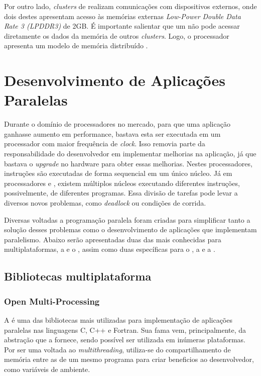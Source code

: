 Por outro lado, \textit{clusters} de \IO realizam comunicações com dispositivos externos, onde dois destes apresentam acesso às memórias externas \textit{Low-Power Double Data Rate 3 (LPDDR3)} de 2GB. É importante salientar que um \CC não pode acessar diretamente os dados da memória de outros \textit{clusters}. Logo, o processador apresenta um modelo de memória distribuído \cite{Castro-Souza-CCPE:2016, Podesta2018Stencil}.

\section{Desenvolvimento de Aplicações Paralelas}
\label{sec:bibliotecasdevparalelo}

Durante o domínio de processadores \singlecore no mercado, para que uma aplicação ganhasse aumento em performance, bastava esta ser executada em um processador com maior frequência de \textit{clock}. Isso removia parte da responsabilidade do desenvolvedor em implementar melhorias na aplicação, já que bastava o \textit{upgrade} no hardware para obter essas melhorias. Nestes processadores, instruções são executadas de forma sequencial em um único núcleo. Já em processadores \multicore e \manycore, existem múltiplos núcleos executando diferentes instruções, possivelmente, de diferentes programas. Essa divisão de tarefas pode levar a diversos novos problemas, como \textit{deadlock} ou condições de corrida.

Diversas \APIs voltadas a programação paralela foram criadas para simplificar tanto a solução desses problemas como o desenvolvimento de aplicações que implementam paralelismo. Abaixo serão apresentadas duas das mais conhecidas \APIs para multiplataformas, a \OpenMP e o \MPI, assim como duas \APIs específicas para o \mppa, a \ASYNC e a \IPC.

\subsection{Bibliotecas multiplataforma}
\label{sec:bibliotecasmultiplataforma}

\subsubsection{Open Multi-Processing}
\label{sec:openmp}

A \OpenMP é uma das bibliotecas mais utilizadas para implementação de aplicações paralelas nas linguagens C, C++ e Fortran. Sua fama vem, principalmente, da abstração que a \API fornece, sendo possível ser utilizada em inúmeras plataformas. Por ser uma \API voltada ao \textit{multithreading}, utiliza-se do compartilhamento de memória entre as \threads de um mesmo programa para criar beneficios ao desenvolvedor, como variáveis de ambiente.

